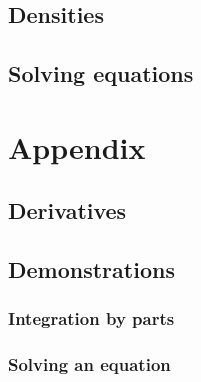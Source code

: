 \documentclass{report}
\begin{document}
\chapter{Densities}


\chapter{Solving equations}


\appendix
\part{Appendix}
\chapter{Derivatives}
\label{Titan:the_derivatives}

\chapter{Demonstrations}
\section{Integration by parts}
\label{math:int_by_part}
\section{Solving an equation}
\label{math:solving}

\clearpage


\end{document}
